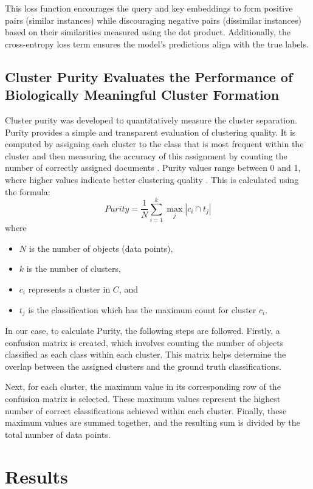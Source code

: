 \documentclass[12pt,a4paper]{article}
\begin{document}
This loss function encourages the query and key embeddings to form positive pairs (similar instances) while discouraging negative pairs (dissimilar instances) based on their similarities measured using the dot product. Additionally, the cross-entropy loss term ensures the model's predictions align with the true labels.

\subsection{Cluster Purity Evaluates the Performance of Biologically Meaningful Cluster Formation}
\label{cp}

Cluster purity was developed to quantitatively measure the cluster separation. Purity provides a simple and transparent evaluation of clustering quality. It is computed by assigning each cluster to the class that is most frequent within the cluster and then measuring the accuracy of this assignment by counting the number of correctly assigned documents \cite{ISBN_0521865719}. Purity values range between 0 and 1, where higher values indicate better clustering quality \cite{ISBN_0521865719}. This is calculated using the formula:
$$
Purity = \frac{1}{N} \sum_{i=1}^{k} \max_j |c_i \cap t_j|
$$
where
\begin{itemize}
	\item $N$ is the number of objects (data points),
	\item $k$ is the number of clusters,
	\item $c_i$ represents a cluster in $C$, and
	\item $t_j$ is the classification which has the maximum count for cluster $c_i$.
\end{itemize}

In our case, to calculate Purity, the following steps are followed. Firstly, a confusion matrix is created, which involves counting the number of objects classified as each class within each cluster. This matrix helps determine the overlap between the assigned clusters and the ground truth classifications.

Next, for each cluster, the maximum value in its corresponding row of the confusion matrix is selected. These maximum values represent the highest number of correct classifications achieved within each cluster. Finally, these maximum values are summed together, and the resulting sum is divided by the total number of data points.

\section{Results}
\end{document}
